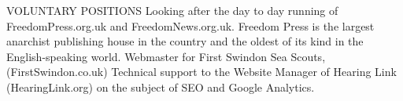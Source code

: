 VOLUNTARY POSITIONS
Looking after the day to day running of FreedomPress.org.uk and FreedomNews.org.uk. Freedom Press is the largest anarchist publishing house in the country and the oldest of its kind in the English-speaking world.
Webmaster for First Swindon Sea Scouts, (FirstSwindon.co.uk)
Technical support to the Website Manager of Hearing Link (HearingLink.org) on the subject of SEO and Google Analytics.
